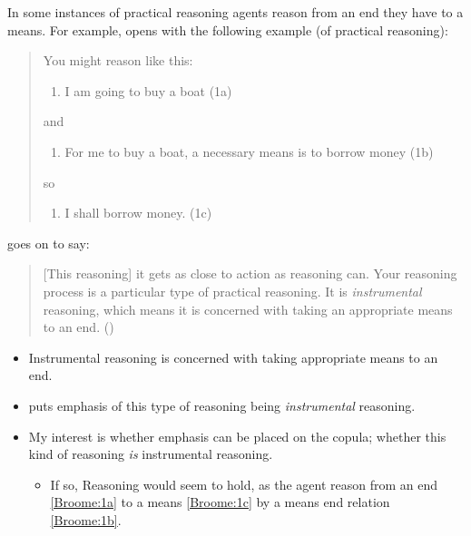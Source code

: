 \documentclass[10pt]{article}
\newcommand{\hozlinedash}[0]{%
  \noindent\hdashrule[0.5ex][c]{\textwidth}{.1pt}{2.5pt}
}
\newcommand{\schemaName}[1]{\textsf{#1}}
\begin{document}
\hozlinedash

In some instances of practical reasoning agents reason from an end they have to a means.
For example, \citeauthor{Broome:2002aa} opens  with the following example (of practical reasoning):

\begin{quote}
  You might reason like this:

  \begin{enumerate}[label={\color{white} (1\alph*)}, ref=(1\alph*)]
  \item\label{Broome:1a} I am going to buy a boat \hfill (1a)
  \end{enumerate}

  and

  \begin{enumerate}[label={\color{white} (1\alph*)}, ref=(1\alph*), resume]
  \item\label{Broome:1b} For me to buy a boat, a necessary means is to borrow money \hfill (1b)
  \end{enumerate}
  so

  \begin{enumerate}[label={\color{white} (1\alph*)}, ref=(1\alph*), resume]
  \item\label{Broome:1c} I shall borrow money. \hfill (1c)
  \end{enumerate}

\end{quote}

\citeauthor{Broome:2002aa} goes on to say:

\begin{quote}
  [This reasoning] it gets as close to action as reasoning can.
  Your reasoning process is a particular type of practical reasoning.
  It is \emph{instrumental} reasoning, which means it is concerned with taking an appropriate means to an end.\nolinebreak
  \mbox{}\hfill\mbox{(\citeyear[86]{Broome:2002aa})}
\end{quote}

\begin{itemize}[noitemsep]
\item Instrumental reasoning is concerned with taking appropriate means to an end.
\item \citeauthor{Broome:2002aa} puts emphasis of this type of reasoning being \emph{instrumental} reasoning.
\item My interest is whether emphasis can be placed on the copula; whether this kind of reasoning \emph{is} instrumental reasoning.
  \begin{itemize}[noitemsep]
  \item If so, \schemaName{Reasoning} would seem to hold, as the agent reason from an end \ref{Broome:1a} to a means \ref{Broome:1c} by a means end relation \ref{Broome:1b}.
  \end{itemize}
\end{itemize}
\end{document}
